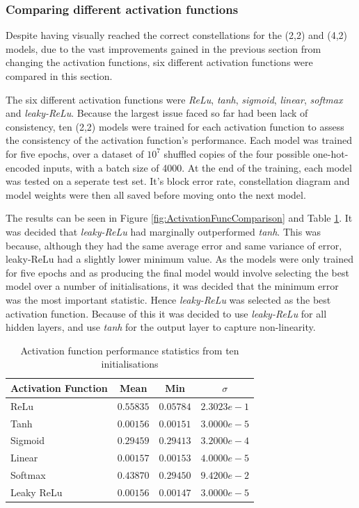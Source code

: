 \documentclass[12pt,onecolumn,letterpaper]{article}
\newcommand{\code}{\textit}
\begin{document}
\subsubsection{Comparing different activation functions}

Despite having visually reached the correct constellations for the (2,2) and (4,2) models, due to the vast improvements gained in the previous section from changing the activation functions, six different activation functions were compared in this section.

The six different activation functions were \code{ReLu}, \code{tanh}, \code{sigmoid}, \code{linear}, \code{softmax} and \code{leaky-ReLu}. Because the largest issue faced so far had been lack of consistency, ten (2,2) models were trained for each activation function to assess the consistency of the activation function's performance. Each model was trained for five epochs, over a dataset of $10^7$ shuffled copies of the four possible one-hot-encoded inputs, with a batch size of 4000. At the end of the training, each model was tested on a seperate test set. It's block error rate, constellation diagram and model weights were then all saved before moving onto the next model.

The results can be seen in Figure \ref{fig:ActivationFuncComparison} and Table \ref{tab:ActivationFuncComparison}. It was decided that \code{leaky-ReLu} had marginally outperformed \code{tanh}. This was because, although they had the same average error and same variance of error, leaky-ReLu had a slightly lower minimum value. As the models were only trained for five epochs and as producing the final model would involve selecting the best model over a number of initialisations, it was decided that the minimum error was the most important statistic. Hence \code{leaky-ReLu} was selected as the best activation function. Because of this it was decided to use \code{leaky-ReLu} for all hidden layers, and use \code{tanh} for the output layer to capture non-linearity. 

\begin{table}[H]
\begin{center}
\begin{tabular}{|l|c|c|c|}
\hline
Activation Function & Mean & Min & $\sigma$\\
\hline\hline
ReLu & $0.55835$ & $0.05784$ & $2.3023e-1$ \\
Tanh & $0.00156$ & $0.00151$ & $3.0000e-5$ \\
Sigmoid & $0.29459$ & $0.29413$ & $3.2000e-4$\\
Linear & $0.00157$ & $0.00153$ & $4.0000e-5$\\
Softmax & $0.43870$ & $0.29450$ & $9.4200e-2$\\
Leaky ReLu & $0.00156$ & $0.00147$ & $3.0000e-5$\\
\hline
\end{tabular}
\end{center}
\caption{Activation function performance statistics from ten initialisations}
\label{tab:ActivationFuncComparison}
\end{table}
\end{document}
